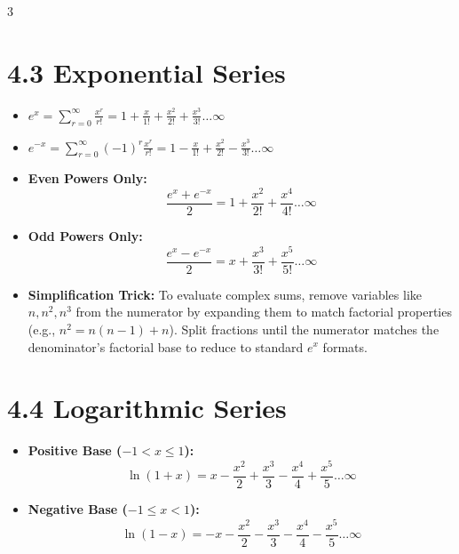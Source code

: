 \documentclass[11pt,a4paper,landscape]{article}
\begin{document}
\begin{multicols*}{3}
\section*{4.3 Exponential Series}
\begin{itemize}
\item $e^x = \sum_{r=0}^\infty \frac{x^r}{r!} = 1 + \frac{x}{1!} + \frac{x^2}{2!} + \frac{x^3}{3!} \dots \infty$
\item $e^{-x} = \sum_{r=0}^\infty (-1)^r \frac{x^r}{r!} = 1 - \frac{x}{1!} + \frac{x^2}{2!} - \frac{x^3}{3!} \dots \infty$
\item \textbf{Even Powers Only:}
  $$ \frac{e^x + e^{-x}}{2} = 1 + \frac{x^2}{2!} + \frac{x^4}{4!} \dots \infty $$
\item \textbf{Odd Powers Only:}
  $$ \frac{e^x - e^{-x}}{2} = x + \frac{x^3}{3!} + \frac{x^5}{5!} \dots \infty $$
\item \textbf{Simplification Trick:} To evaluate complex sums, remove variables like $n, n^2, n^3$ from the numerator by expanding them to match factorial properties (e.g., $n^2 = n(n-1)+n$). Split fractions until the numerator matches the denominator's factorial base to reduce to standard $e^x$ formats.
\end{itemize}

\section*{4.4 Logarithmic Series}
\begin{itemize}
\item \textbf{Positive Base ($ -1 < x \le 1 $):}
  $$ \ln(1+x) = x - \frac{x^2}{2} + \frac{x^3}{3} - \frac{x^4}{4} + \frac{x^5}{5} \dots \infty $$
\item \textbf{Negative Base ($ -1 \le x < 1 $):}
  $$ \ln(1-x) = -x - \frac{x^2}{2} - \frac{x^3}{3} - \frac{x^4}{4} - \frac{x^5}{5} \dots \infty $$
\end{itemize}

\end{multicols*}
\end{document}
